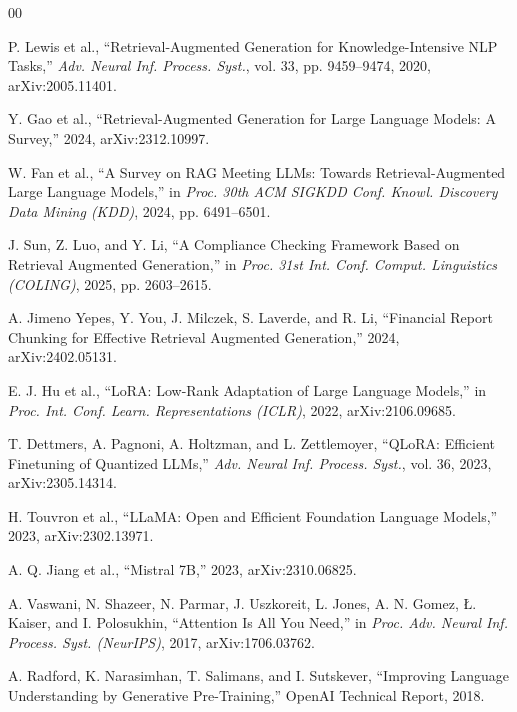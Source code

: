 \documentclass[conference]{IEEEtran}
\begin{document}
\begin{thebibliography}{00}

P. Lewis et al., ``Retrieval-Augmented Generation for Knowledge-Intensive NLP Tasks,'' \textit{Adv. Neural Inf. Process. Syst.}, vol. 33, pp. 9459--9474, 2020, arXiv:2005.11401.

Y. Gao et al., ``Retrieval-Augmented Generation for Large Language Models: A Survey,'' 2024, arXiv:2312.10997.

W. Fan et al., ``A Survey on RAG Meeting LLMs: Towards Retrieval-Augmented Large Language Models,'' in \textit{Proc. 30th ACM SIGKDD Conf. Knowl. Discovery Data Mining (KDD)}, 2024, pp. 6491--6501.

J. Sun, Z. Luo, and Y. Li, ``A Compliance Checking Framework Based on Retrieval Augmented Generation,'' in \textit{Proc. 31st Int. Conf. Comput. Linguistics (COLING)}, 2025, pp. 2603--2615.

A. Jimeno Yepes, Y. You, J. Milczek, S. Laverde, and R. Li, ``Financial Report Chunking for Effective Retrieval Augmented Generation,'' 2024, arXiv:2402.05131.

E. J. Hu et al., ``LoRA: Low-Rank Adaptation of Large Language Models,'' in \textit{Proc. Int. Conf. Learn. Representations (ICLR)}, 2022, arXiv:2106.09685.

T. Dettmers, A. Pagnoni, A. Holtzman, and L. Zettlemoyer, ``QLoRA: Efficient Finetuning of Quantized LLMs,'' \textit{Adv. Neural Inf. Process. Syst.}, vol. 36, 2023, arXiv:2305.14314.

H. Touvron et al., ``LLaMA: Open and Efficient Foundation Language Models,'' 2023, arXiv:2302.13971.

A. Q. Jiang et al., ``Mistral 7B,'' 2023, arXiv:2310.06825.

A. Vaswani, N. Shazeer, N. Parmar, J. Uszkoreit, L. Jones, A. N. Gomez, \L. Kaiser, and I. Polosukhin, ``Attention Is All You Need,'' in \textit{Proc. Adv. Neural Inf. Process. Syst. (NeurIPS)}, 2017, arXiv:1706.03762.

A. Radford, K. Narasimhan, T. Salimans, and I. Sutskever, ``Improving Language Understanding by Generative Pre-Training,'' OpenAI Technical Report, 2018.


\end{thebibliography}
\end{document}
